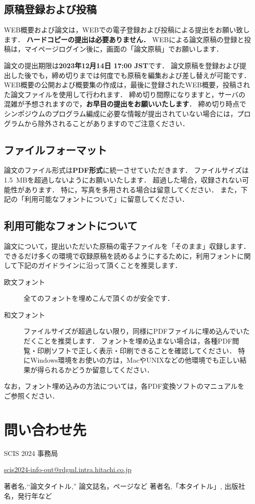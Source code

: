 \documentclass{jarticle} %
\begin{document}
\subsection{原稿登録および投稿}

WEB概要および論文は，WEBでの電子登録および投稿による提出をお願い致します．
\textbf{ハードコピーの提出は必要ありません．}
WEBによる論文原稿の登録と投稿は，マイページログイン後に，画面の「論文原稿」でお願いします．

論文の提出期限は\textbf{2023年12月14日 17:00 JST}です．
論文原稿を登録および提出した後でも，締め切りまでは何度でも原稿を編集および差し替えが可能です．
WEB概要の公開および概要集の作成は，最後に登録されたWEB概要，投稿された論文ファイルを使用して行われます．
締め切り間際になりますと，サーバの混雑が予想されますので，\textbf{お早目の提出をお願いいたします}．
締め切り時点でシンポジウムのプログラム編成に必要な情報が提出されていない場合には，プログラムから除外されることがありますのでご注意ください．


\subsection{ファイルフォーマット}

論文のファイル形式は\textbf{PDF形式}に統一させていただきます．
ファイルサイズは1.5~MBを超過しないようにお願いいたします．
超過した場合，収録されない可能性があります．
特に，写真を多用される場合は留意してください．
また，下記の「利用可能なフォントについて」に留意してください．


\subsection{利用可能なフォントについて}

論文について，提出いただいた原稿の電子ファイルを「そのまま」収録します．
できるだけ多くの環境で収録原稿を読めるようにするために，利用フォントに関して下記のガイドラインに沿って頂くことを推奨します．

\begin{description}
  \item[欧文フォント]
    全てのフォントを埋めこんで頂くのが安全です．
  \item[和文フォント]
    ファイルサイズが超過しない限り，同様にPDFファイルに埋め込んでいただくことを推奨します．
    フォントを埋め込まない場合は，各種PDF閲覧・印刷ソフトで正しく表示・印刷できることを確認してください．
    特にWindows環境をお使いの方は，MacやUNIXなどの他環境でも正しい結果が得られるかどうか留意してください．
\end{description}

なお，フォント埋め込みの方法については，各PDF変換ソフトのマニュアルをご参照ください．


\section{問い合わせ先}

SCIS 2024 事務局

\url{scis2024-info-out@rdgml.intra.hitachi.co.jp}

\begin{thebibliography}{9}
著者名,\lq\lq 論文タイトル,'' 論文誌名，ページなど
著者名,「本タイトル」, 出版社名，発行年など
\end{thebibliography}
\end{document}
